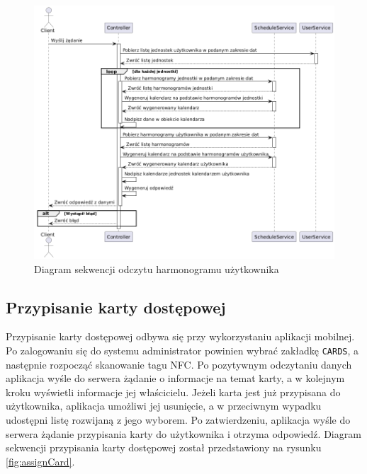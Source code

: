 \begin{figure}[H]
    \centering
    \includegraphics[width=\textwidth]{graf/schSeq.png}
    \caption{Diagram sekwencji odczytu harmonogramu użytkownika}
    \label{fig:scheduleSequence}
\end{figure}

\subsection{Przypisanie  karty dostępowej}
\label{sec:addNfc}

Przypisanie karty dostępowej odbywa się przy wykorzystaniu aplikacji mobilnej. Po zalogowaniu się do systemu administrator powinien wybrać zakładkę \texttt{CARDS}, a następnie rozpocząć skanowanie tagu NFC. Po pozytywnym odczytaniu danych aplikacja wyśle do serwera żądanie o informacje na temat karty, a w kolejnym kroku wyświetli informacje jej właścicielu. Jeżeli karta jest już przypisana do użytkownika, aplikacja umożliwi jej usunięcie, a w przeciwnym wypadku udostępni listę rozwijaną z jego wyborem. Po zatwierdzeniu, aplikacja wyśle do serwera żądanie przypisania karty do użytkownika i otrzyma odpowiedź. Diagram sekwencji przypisania karty dostępowej został przedstawiony na rysunku \ref{fig:assignCard}.

